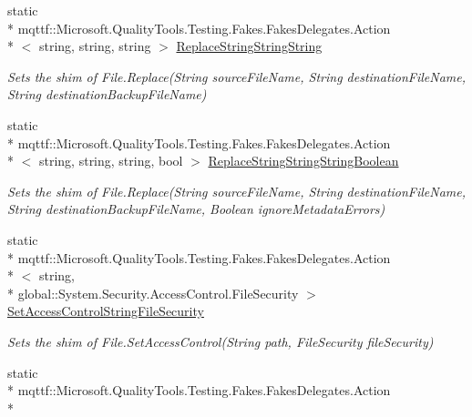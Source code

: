 \begin{DoxyCompactItemize}
static \\*
mqttf\-::\-Microsoft.\-Quality\-Tools.\-Testing.\-Fakes.\-Fakes\-Delegates.\-Action\\*
$<$ string, string, string $>$ \hyperlink{class_system_1_1_i_o_1_1_fakes_1_1_shim_file_adf81aad01436972b674b4fb0671c6d64}{Replace\-String\-String\-String}
\begin{DoxyCompactList}\small\item\em Sets the shim of File.\-Replace(\-String source\-File\-Name, String destination\-File\-Name, String destination\-Backup\-File\-Name)\end{DoxyCompactList}\item 
static \\*
mqttf\-::\-Microsoft.\-Quality\-Tools.\-Testing.\-Fakes.\-Fakes\-Delegates.\-Action\\*
$<$ string, string, string, bool $>$ \hyperlink{class_system_1_1_i_o_1_1_fakes_1_1_shim_file_a6aee2c2db0749f686898c7f9e7747404}{Replace\-String\-String\-String\-Boolean}
\begin{DoxyCompactList}\small\item\em Sets the shim of File.\-Replace(\-String source\-File\-Name, String destination\-File\-Name, String destination\-Backup\-File\-Name, Boolean ignore\-Metadata\-Errors)\end{DoxyCompactList}\item 
static \\*
mqttf\-::\-Microsoft.\-Quality\-Tools.\-Testing.\-Fakes.\-Fakes\-Delegates.\-Action\\*
$<$ string, \\*
global\-::\-System.\-Security.\-Access\-Control.\-File\-Security $>$ \hyperlink{class_system_1_1_i_o_1_1_fakes_1_1_shim_file_a1d1edca0352c712bc54c2af802d64adb}{Set\-Access\-Control\-String\-File\-Security}
\begin{DoxyCompactList}\small\item\em Sets the shim of File.\-Set\-Access\-Control(\-String path, File\-Security file\-Security)\end{DoxyCompactList}\item 
static \\*
mqttf\-::\-Microsoft.\-Quality\-Tools.\-Testing.\-Fakes.\-Fakes\-Delegates.\-Action\\*

\end{DoxyCompactItemize}
